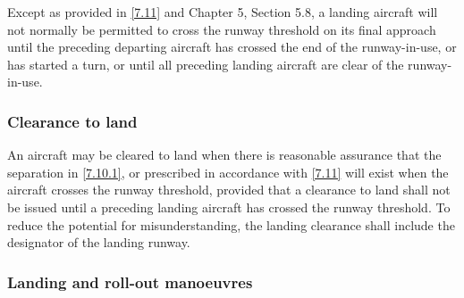 \documentclass[../vATM.tex]{subfiles}
\begin{document}
    Except as provided in \ref{7.11} and Chapter 5, Section 5.8, a landing aircraft will not normally be permitted to cross the runway threshold on its final approach until the preceding departing aircraft has crossed the end of the runway-in-use, or has started a turn, or until all preceding landing aircraft are clear of the runway-in-use.




    \subsubsection{Clearance to land}

    An aircraft may be cleared to land when there is reasonable assurance that the separation in \ref{7.10.1}, or prescribed in accordance with \ref{7.11} will exist when the aircraft crosses the runway threshold, provided that a clearance to land shall not be issued until a preceding landing aircraft has crossed the runway threshold. To reduce the potential for misunderstanding, the landing clearance shall include the designator of the landing runway.

    \subsubsection{Landing and roll-out manoeuvres}
\end{document}
